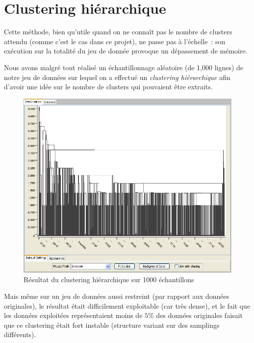 \section{Clustering hiérarchique}
    Cette méthode, bien qu'utile quand on ne connaît pas le nombre de clusters
    attendu (comme c'est le cas dans ce projet), ne passe pas à l'échelle~:
    son exécution sur la totalité du jeu de donnée provoque un dépassement de mémoire.

    Nous avons malgré tout réalisé un échantillonnage aléatoire (de 1,000 lignes)
    de notre jeu de données sur lequel on a effectué un \textit{clustering hiérarchique}
    afin d'avoir une idée sur le nombre de clusters qui pouvaient être extraits.

    \begin{figure}[H]
        \centering
        \includegraphics[scale=0.3]{../screenshots/hierarchical_clustering_1000_samples.png}
        \caption{Résultat du clustering hiérarchique sur 1000 échantillons}
        \label{diagram:hierarchical_clustering_1000_samples}
    \end{figure}

    Mais même sur un jeu de données aussi restreint (par rapport aux données
    originales), le résultat était difficilement exploitable (car très dense),
    et le fait que les données exploitées représentaient moins de $5\%$ des
    données originales faisait que ce clustering était fort instable (structure
    variant sur des samplings différents).

